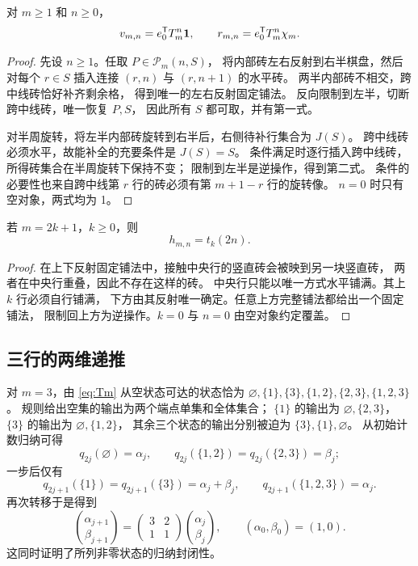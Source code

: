 \begin{lemma}[中线补全双射]\label{lem:half}
对 $m\ge1$ 和 $n\ge0$，
\begin{equation}\label{eq:half-fixed}
 v_{m,n}=e_0^{\mathsf T}T_m^n\boldsymbol{1},\qquad
 r_{m,n}=e_0^{\mathsf T}T_m^n\chi_m.
\end{equation}
\end{lemma}
\begin{proof}
先设 $n\ge1$。任取 $P\in\mathcal P_m(n,S)$，
将内部砖左右反射到右半棋盘，然后对每个 $r\in S$
插入连接 $(r,n)$ 与 $(r,n+1)$ 的水平砖。
两半内部砖不相交，跨中线砖恰好补齐剩余格，
得到唯一的左右反射固定铺法。
反向限制到左半，切断跨中线砖，唯一恢复 $P,S$，
因此所有 $S$ 都可取，并有第一式。

对半周旋转，将左半内部砖旋转到右半后，右侧待补行集合为 $J(S)$。
跨中线砖必须水平，故能补全的充要条件是 $J(S)=S$。
条件满足时逐行插入跨中线砖，所得砖集合在半周旋转下保持不变；
限制到左半是逆操作，得到第二式。
条件的必要性也来自跨中线第 $r$ 行的砖必须有第 $m+1-r$ 行的旋转像。
$n=0$ 时只有空对象，两式均为 1。
\end{proof}

\begin{lemma}[奇数高度的上下反射]\label{lem:h-odd}
若 $m=2k+1$，$k\ge0$，则
\begin{equation}\label{eq:h-odd}
 h_{m,n}=t_k(2n).
\end{equation}
\end{lemma}
\begin{proof}
在上下反射固定铺法中，接触中央行的竖直砖会被映到另一块竖直砖，
两者在中央行重叠，因此不存在这样的砖。
中央行只能以唯一方式水平铺满。其上 $k$ 行必须自行铺满，
下方由其反射唯一确定。任意上方完整铺法都给出一个固定铺法，
限制回上方为逆操作。$k=0$ 与 $n=0$ 由空对象约定覆盖。
\end{proof}

\subsection{三行的两维递推}
对 $m=3$，由 \eqref{eq:Tm} 从空状态可达的状态恰为
$\varnothing,\{1\},\{3\},\{1,2\},\{2,3\},\{1,2,3\}$。
规则给出空集的输出为两个端点单集和全体集合；
$\{1\}$ 的输出为 $\varnothing,\{2,3\}$，
$\{3\}$ 的输出为 $\varnothing,\{1,2\}$，
其余三个状态的输出分别被迫为 $\{3\},\{1\},\varnothing$。
从初始计数归纳可得
\[
 q_{2j}(\varnothing)=\alpha_j,\qquad
 q_{2j}(\{1,2\})=q_{2j}(\{2,3\})=\beta_j;
\]
一步后仅有
\[
 q_{2j+1}(\{1\})=q_{2j+1}(\{3\})=\alpha_j+\beta_j,\qquad
 q_{2j+1}(\{1,2,3\})=\alpha_j.
\]
再次转移于是得到
\begin{equation}\label{eq:two-dimensional}
 \binom{\alpha_{j+1}}{\beta_{j+1}}
 =\begin{pmatrix}3&2\\1&1\end{pmatrix}
 \binom{\alpha_j}{\beta_j},\qquad
 (\alpha_0,\beta_0)=(1,0).
\end{equation}
这同时证明了所列非零状态的归纳封闭性。

